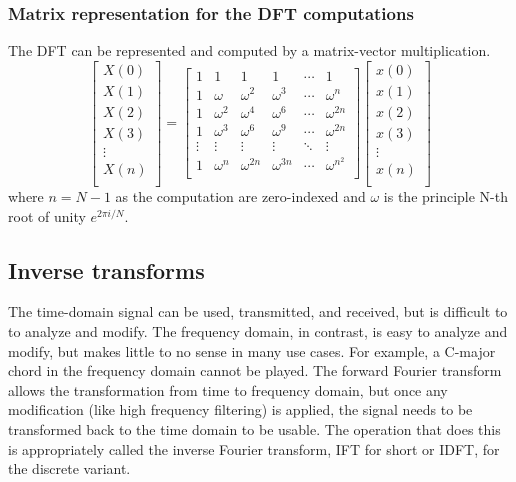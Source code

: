 \subsubsection{Matrix representation for the DFT computations} 
The DFT can be represented and computed by a matrix-vector multiplication. 
$$
\begin{bmatrix}
    X(0) \\
    X(1) \\
    X(2) \\
    X(3) \\
    \vdots\\
    X(n) \\
\end{bmatrix}
=
\begin{bmatrix}
    1 & 1 & 1 & 1 & \cdots & 1\\
    1 & \omega & \omega ^2 & \omega ^3 & \cdots & \omega ^n\\
    1 & \omega ^2 & \omega ^4 & \omega ^6 & \cdots & \omega ^{2n}\\
    1 & \omega ^3 & \omega ^6 & \omega ^9 & \cdots & \omega ^{2n}\\
    \vdots & \vdots & \vdots & \vdots & \ddots & \vdots \\
    1 & \omega ^{n} & \omega ^{2n} & \omega ^{3n} & \cdots & \omega ^{{n^2}}\\
\end{bmatrix}
\begin{bmatrix}
    x(0) \\
    x(1) \\
    x(2) \\
    x(3) \\
    \vdots\\
    x(n) \\
\end{bmatrix}
$$
where $n = N-1$ as the computation are zero-indexed and $\omega$ is the principle N-th root of unity $e^{2\pi i/N} $. 


\subsection{Inverse transforms}
The time-domain signal can be used, transmitted, and received, but is difficult to to analyze and modify. The frequency domain, in contrast, is easy to analyze and modify, but makes little to no sense in many use cases. For example, a C-major chord in the frequency domain cannot be played. The forward Fourier transform allows the transformation from time to frequency domain, but once any modification (like high frequency filtering) is applied, the signal needs to be transformed back to the time domain to be usable. The operation that does this is appropriately called the inverse Fourier transform, IFT for short or IDFT, for the discrete variant.

